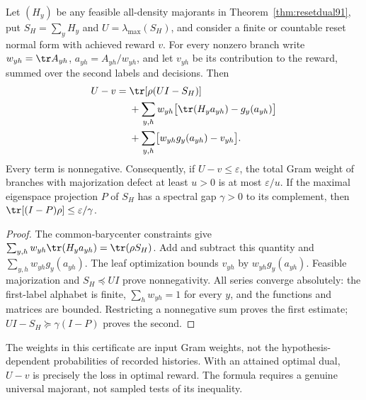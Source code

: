 \begin{corollary}\label{cor:contactdefect91}
Let $(H_y)$ be any feasible all-density majorants in
Theorem~\ref{thm:resetdual91}, put $S_H=\sum_yH_y$ and
$U=\lambda_{\max}(S_H)$, and consider a finite or countable reset
normal form with achieved reward $v$.  For every nonzero branch write
$w_{yh}=\tr A_{yh}$, $a_{yh}=A_{yh}/w_{yh}$, and let $v_{yh}$
be its contribution to the reward, summed over the second labels and
decisions.  Then
\begin{equation}\label{eq:contactdefect91}
\begin{split}
 U-v={}&\tr[\rho(UI-S_H)]\\
 &+\sum_{y,h}w_{yh}\bigl[\tr(H_ya_{yh})-g_y(a_{yh})\bigr]\\
 &+\sum_{y,h}\bigl[w_{yh}g_y(a_{yh})-v_{yh}\bigr].
\end{split}
\end{equation}
Every term is nonnegative.  Consequently, if $U-v\le\varepsilon$,
the total Gram weight of branches with majorization defect at least
$u>0$ is at most $\varepsilon/u$.  If the maximal eigenspace projection
$P$ of $S_H$ has a spectral gap $\gamma>0$ to its complement, then
$\tr[(I-P)\rho]\le\varepsilon/\gamma$.
\end{corollary}
\begin{proof}
The common-barycenter constraints give
$\sum_{y,h}w_{yh}\tr(H_ya_{yh})=\tr(\rho S_H)$.
Add and subtract this quantity and $\sum_{y,h}w_{yh}g_y(a_{yh})$.
The leaf optimization bounds $v_{yh}$ by $w_{yh}g_y(a_{yh})$.
Feasible majorization and $S_H\preceq UI$ prove nonnegativity.
All series converge absolutely: the first-label alphabet is finite,
$\sum_hw_{yh}=1$ for every $y$, and the functions and matrices are
bounded.  Restricting a nonnegative sum proves the first estimate;
$UI-S_H\succeq\gamma(I-P)$ proves the second.
\end{proof}
The weights in this certificate are input Gram weights, not the
hypothesis-dependent probabilities of recorded histories.  With an
attained optimal dual, $U-v$ is precisely the loss in optimal reward.
The formula requires a genuine universal majorant, not sampled tests
of its inequality.

